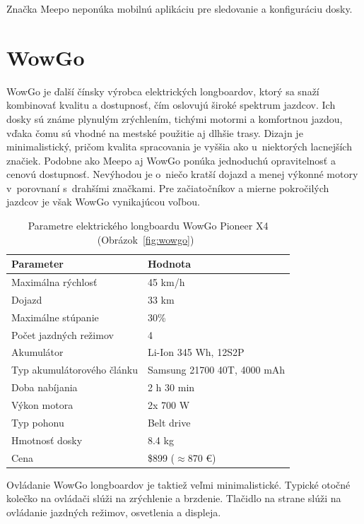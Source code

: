 Značka Meepo neponúka mobilnú aplikáciu pre sledovanie a konfiguráciu dosky.\cite{Meepo}

\section{WowGo}
WowGo je ďalší čínsky výrobca elektrických longboardov, ktorý sa snaží kombinovať kvalitu a dostupnosť, čím oslovujú široké spektrum jazdcov. 
Ich dosky sú známe plynulým zrýchlením, tichými motormi a komfortnou jazdou, vďaka čomu sú vhodné na mestské použitie aj dlhšie trasy. 
Dizajn je minimalistický, pričom kvalita spracovania je vyššia ako u~niektorých lacnejších značiek.
Podobne ako Meepo aj WowGo ponúka jednoduchú opravitelnosť a cenovú dostupnosť. 
Nevýhodou je o~niečo kratší dojazd a menej výkonné motory v~porovnaní s~drahšími značkami. 
Pre začiatočníkov a mierne pokročilých jazdcov je však WowGo vynikajúcou voľbou.

\begin{table}[h]
    \centering
    \begin{tabular}{|l|l|}
        \hline
        \textbf{Parameter} & \textbf{Hodnota} \\ \hline
        Maximálna rýchlosť & 45 km/h \\ \hline
        Dojazd & 33 km \\ \hline
        Maximálne stúpanie & 30\% \\ \hline
        Počet jazdných režimov & 4 \\ \hline
        Akumulátor & Li-Ion 345 Wh, 12S2P \\ \hline
        Typ akumulátorového článku & Samsung 21700 40T, 4000 mAh \\ \hline
        Doba nabíjania & 2 h 30 min \\ \hline
        Výkon motora & 2x 700 W \\ \hline
        Typ pohonu & Belt drive \\ \hline
        Hmotnosť dosky & 8.4 kg \\ \hline
        Cena & \$899 ($\approx$870 €) \\ \hline
    \end{tabular}
    \caption{Parametre elektrického longboardu WowGo Pioneer X4 (Obrázok~\ref{fig:wowgo})~\cite{WowGo}}\label{tab:wowgo}
\end{table}

Ovládanie WowGo longboardov je taktiež veľmi minimalistické.
Typické otočné kolečko na ovládači slúži na zrýchlenie a brzdenie.
Tlačidlo na strane slúži na ovládanie jazdných režimov, osvetlenia a displeja.

